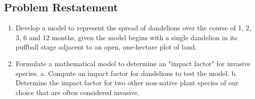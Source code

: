 \subsection{Problem Restatement}

 \begin{enumerate}
 \item Develop a model to represent the spread of dandelions over the course of 1, 2, 3, 6 and 12 months, given the model begins with a single dandelion in its puffball stage adjacent to an open, one-hectare plot of land.
\item Formulate a mathematical model to determine an "impact factor" for invasive species.
\subitem a. Compute an impact factor for dandelions to test the model.
\subitem b. Determine the impact factor for two other non-native plant species of 
our choice that are often considered invasive.

\end{enumerate}
